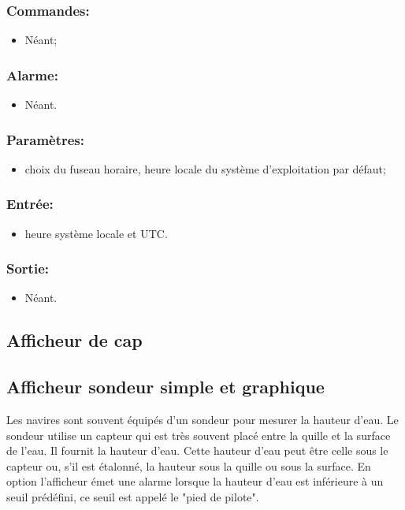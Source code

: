 \documentclass[a4paper,11pt]{report}
\begin{document}
\subsubsection{Commandes:}
\begin{itemize}
	\item Néant;
\end{itemize}

\subsubsection{Alarme:}
\begin{itemize}
	\item Néant.
\end{itemize}

\subsubsection{Paramètres:}
\begin{itemize}
	\item choix du fuseau horaire,
      heure locale du système d'exploitation par défaut;
\end{itemize}

\subsubsection{Entrée:}
\begin{itemize}
	\item heure système locale et UTC.
\end{itemize}

\subsubsection{Sortie:}
\begin{itemize}
	\item Néant.
\end{itemize}

\subsection{Afficheur de cap}



\subsection{Afficheur sondeur simple et graphique}

Les navires sont souvent équipés d'un sondeur pour mesurer la hauteur d'eau.
Le sondeur utilise un capteur qui est très souvent placé
entre la quille et la surface de l'eau.
Il fournit la hauteur d'eau. Cette hauteur d'eau peut être
celle sous le capteur ou, s'il est étalonné,
la hauteur sous la quille ou sous la surface.
En option l'afficheur émet une alarme lorsque la hauteur d'eau
est inférieure à un seuil prédéfini,
ce seuil est appelé le "pied de pilote".
\end{document}
